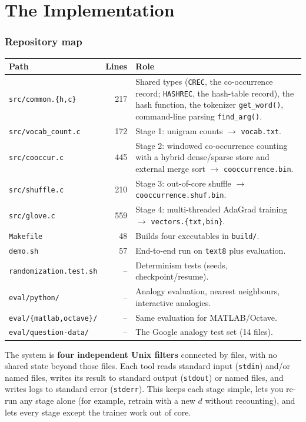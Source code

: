 \documentclass[11pt,a4paper]{article}
\newcommand{\file}[1]{\texttt{#1}}
\newcommand{\fn}[1]{\texttt{#1()}}
\begin{document}
\part{The Implementation}

\section{Repository map}

\begin{center}
\begin{tabularx}{\linewidth}{lrX}
\toprule
Path & Lines & Role \\
\midrule
\file{src/common.\{h,c\}} & 217 & Shared types (\texttt{CREC}, the co-occurrence record; \texttt{HASHREC}, the hash-table record), the hash
  function, the tokenizer \fn{get\_word}, command-line parsing \fn{find\_arg}. \\
\file{src/vocab\_count.c} & 172 & Stage 1: unigram counts $\rightarrow$ \file{vocab.txt}. \\
\file{src/cooccur.c}      & 445 & Stage 2: windowed co-occurrence counting with a hybrid
  dense/sparse store and external merge sort $\rightarrow$ \file{cooccurrence.bin}. \\
\file{src/shuffle.c}      & 210 & Stage 3: out-of-core shuffle $\rightarrow$
  \file{cooccurrence.shuf.bin}. \\
\file{src/glove.c}        & 559 & Stage 4: multi-threaded AdaGrad training $\rightarrow$
  \file{vectors.\{txt,bin\}}. \\
\file{Makefile}           & 48  & Builds four executables in \file{build/}. \\
\file{demo.sh}            & 57  & End-to-end run on \texttt{text8} plus evaluation. \\
\file{randomization.test.sh} & -- & Determinism tests (seeds, checkpoint/resume). \\
\file{eval/python/}       & -- & Analogy evaluation, nearest neighbours, interactive analogies. \\
\file{eval/\{matlab,octave\}/} & -- & Same evaluation for MATLAB/Octave. \\
\file{eval/question-data/} & -- & The Google analogy test set (14 files). \\
\bottomrule
\end{tabularx}
\end{center}

The system is \textbf{four independent Unix filters} connected by files, with no shared
state beyond those files. Each tool reads standard input (\texttt{stdin}) and/or named files, writes its
result to standard output (\texttt{stdout}) or named files, and writes logs to standard
error (\texttt{stderr}). This keeps
each stage simple, lets you re-run any stage alone (for example, retrain with a new $d$
without recounting), and lets every stage except the trainer work out of core.
\end{document}
